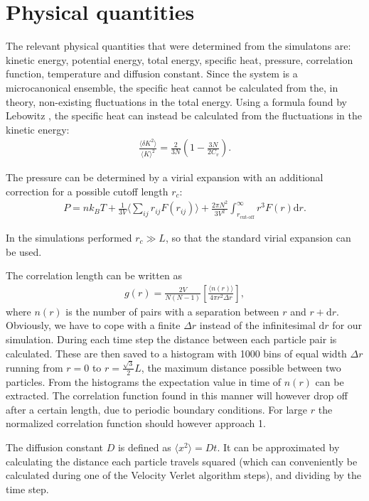 \section{Physical quantities}
The relevant physical quantities that were determined from the simulatons are: kinetic energy, potential energy, total energy, specific heat, pressure, correlation function, temperature and diffusion constant. Since the system is a microcanonical ensemble, the specific heat cannot be calculated from the, in theory, non-existing fluctuations in the total energy\cite{jos}. Using a formula found by Lebowitz \cite{lebowitz1967ensemble}, the specific heat can instead be calculated from the fluctuations in the kinetic energy:
\begin{gather*}
    \frac{\langle \delta K^2\rangle}{\langle K\rangle^2}=\frac{2}{3N}\left( 1-\frac{3N}{2C_v}\right).
\end{gather*}

The pressure can be determined by a virial expansion with an additional correction for a possible cutoff length $r_c$:
\begin{gather*}
    P = nk_BT + \frac{1}{3V}\Big \langle \sum_{ij} r_{ij}F(r_{ij})\Big \rangle + \frac{2\pi N^2}{3V^2}\int_{r_{\text{cut-off}}}^{\infty}r^3 F(r) \text{d}r.
\end{gather*}

In the simulations performed $r_c \gg L$, so that the standard virial expansion can be used.

The correlation length can be written as
\begin{gather*}
    g(r)=\frac{2V}{N(N-1)}\left[\frac{\langle n(r)\rangle}{4\pi r^2\Delta r}\right],
\end{gather*}
where $n(r)$ is the number of pairs with a separation between $r$ and $r + \mathrm{d}r$. Obviously, we have to cope with a finite $\Delta r$ instead of the infinitesimal $\mathrm{d}r$ for our simulation. During each time step the distance between each particle pair is calculated. These are then saved to a histogram with 1000 bins of equal width $\Delta r$ running from $r = 0$ to $r = \frac{\sqrt{3}}{2}L$, the maximum distance possible between two particles. From the histograms the expectation value in time of $n(r)$ can be extracted. The correlation function found in this manner will however drop off after a certain length, due to periodic boundary conditions. For large $r$ the normalized correlation function should however approach 1.

The diffusion constant $D$ is defined as $\langle x^2\rangle = Dt$. It can be approximated by calculating the distance each particle travels squared (which can conveniently be calculated during one of the Velocity Verlet algorithm steps), and dividing by the time step.